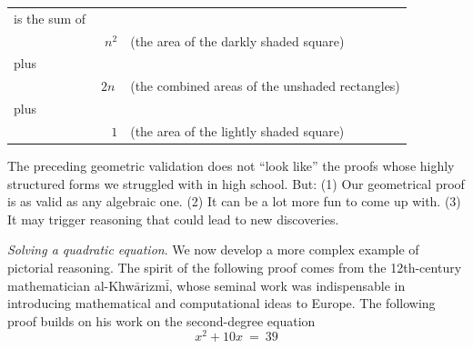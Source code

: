 \smallskip

\begin{tabular}{lcl}
is the sum of & \\
  & \ $n^2$ & (the area of the darkly shaded square) \\
plus & \\
  & $2n$ & (the combined areas of the unshaded rectangles) \\
plus & \\
  & \ \ $1$ & (the area of the lightly shaded square)
\end{tabular}

\medskip

\noindent
The preceding geometric validation does not ``look like'' the proofs whose highly structured forms we struggled with in high school.  But: (1) Our geometrical proof is as valid as any algebraic one.  (2) It can be a lot more fun to come up with.  (3) It may trigger reasoning that could lead to new discoveries.

\bigskip


 {\it Solving a quadratic equation}.
We now develop a more complex example of pictorial reasoning.  The spirit of the following proof comes from the 12th-century mathematician al-Khw$\bar{\mbox{a}}$rizm$\bar{\mbox{i}}$, whose seminal work \cite{Al-Khwarizmi} was indispensable in introducing mathematical and computational ideas to Europe.  The following proof builds on his work on the second-degree equation
\begin{equation}
\label{eq:al-Khwarizimi}
x^2 + 10 x \ = \ 39
\end{equation}

\bigskip

\noindent {}

